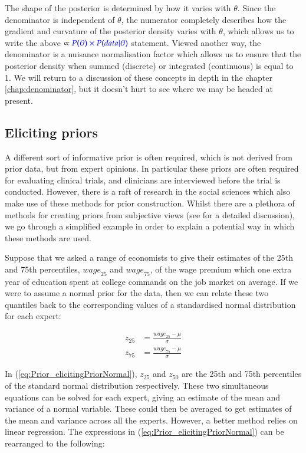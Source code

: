 \documentclass[11pt,fullpage]{book}
\begin{document}
The shape of the posterior is determined by how it varies with $\theta$. Since the denominator is independent of $\theta$, the numerator completely describes how the gradient and curvature of the posterior density varies with $\theta$, which allows us to write the above  $ \propto {\color{blue}P(\theta)\times P(data|\theta)}$ statement. Viewed another way, the denominator is a nuisance normalisation factor which allows us to ensure that the posterior density when summed (discrete) or integrated (continuous) is equal to 1. We will return to a discussion of these concepts in depth in the chapter \ref{chap:denominator}, but it doesn't hurt to see where we may be headed at present.


\subsection{Eliciting priors}
A different sort of informative prior is often required, which is not derived from prior data, but from expert opinions. In particular these priors are often required for evaluating clinical trials, and clinicians are interviewed before the trial is conducted. However, there is a raft of research in the social sciences which also make use of these methods for prior construction. Whilst there are a plethora of methods for creating priors from subjective views (see \cite{gill2007bayesian} for a detailed discussion), we go through a simplified example in order to explain a potential way in which these methods are used. 

Suppose that we asked a range of economists to give their estimates of the 25th and 75th percentiles, ${wage}_{25}$ and ${wage}_{75}$, of the wage premium which one extra year of education spent at college commands on the job market on average. If we were to assume a normal prior for the data, then we can relate these two quantiles back to the corresponding values of a standardised normal distribution for each expert:

\begin{equation}\label{eq:Prior_elicitingPriorNormal}
\begin{align}
z_{25} &= \frac{{wage}_{25} - \mu}{\sigma}\\
z_{75} &= \frac{{wage}_{75} - \mu}{\sigma}
\end{align}
\end{equation}

In (\ref{eq:Prior_elicitingPriorNormal}), $z_{25}$ and $z_{50}$ are the 25th and 75th percentiles of the standard normal distribution respectively. These two simultaneous equations can be solved for each expert, giving an estimate of the mean and variance of a normal variable. These could then be averaged to get estimates of the mean and variance across all the experts. However, a better method relies on linear regression. The expressions in (\ref{eq:Prior_elicitingPriorNormal}) can be rearranged to the following:
\end{document}
